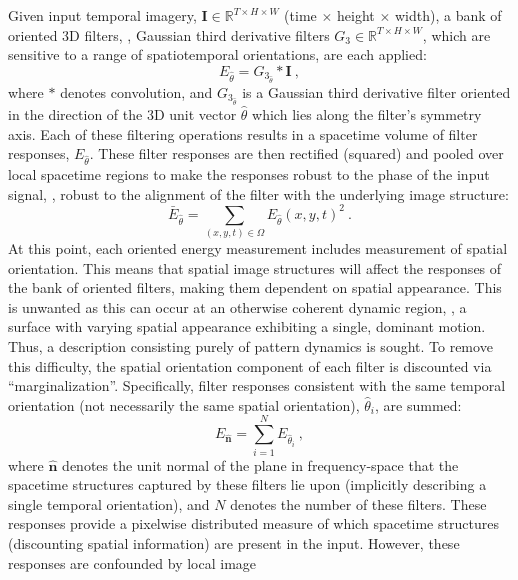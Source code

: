 Given input temporal imagery, $\mathbf{I} \in \mathbb{R}^{T \times H \times W}$ (time $\times$ height $\times$ width), a bank of oriented 3D
filters, \eg, Gaussian third derivative filters $G_3 \in \mathbb{R}^{T \times H \times W}$, which are sensitive to a range of
spatiotemporal orientations, are each applied:
\begin{equation}
	E_{\hat{\theta}} = G_{3_{\hat{\theta}}} \ast \mathbf{I}\ ,
\end{equation}
where $\ast$ denotes convolution, and $G_{3_{\hat{\theta}}}$ is a Gaussian third derivative filter oriented in the direction of the 3D unit vector $\hat{\theta}$ which lies along the filter's symmetry axis. Each of these filtering operations results in a spacetime volume of filter responses, $E_{\hat{\theta}}$.
These filter responses are then rectified (squared) and
pooled over local spacetime regions to make the responses robust
to the phase of the input signal, \ie, robust to the
alignment of the filter with the underlying image
structure:
\begin{equation}
	\bar{E}_{\hat{\theta}} = \sum_{(x, y, t) \in \Omega}{{E_{\hat{\theta}}(x, y, t)}^2}\ .
\end{equation}
At this point, each oriented energy measurement includes measurement of spatial orientation. This means that spatial image structures will affect the responses of the bank of oriented filters, making them dependent on spatial appearance. This is unwanted as this can occur at an otherwise coherent dynamic region, \eg, a surface with varying spatial appearance exhibiting a single, dominant motion. Thus, a description consisting purely of pattern dynamics is sought.
To remove this difficulty, the spatial orientation component of each filter is discounted via ``marginalization''. Specifically, filter responses consistent with the same temporal orientation (not necessarily the same spatial orientation), $\hat{\theta}_i$, are summed:
\begin{equation}
	E_{\hat{\mathbf{n}}} = \sum_{i = 1}^{N}{E_{\hat{\theta}_i}}\ ,
	\label{eq:oriented_filter_2.8}
\end{equation}
where $\hat{\mathbf{n}}$ denotes the unit normal of the plane in frequency-space that the spacetime structures captured by these filters lie upon (implicitly describing a single temporal orientation), and $N$ denotes the number of these filters.
These responses provide a pixelwise distributed measure
of which spacetime structures (discounting spatial information) are
present in the input.
However, these responses are confounded by local image
